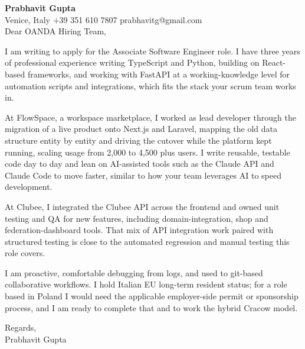 \documentclass[a4paper,10.5pt]{article}
\begin{document}
\textbf{Prabhavit Gupta}\\
Venice, Italy \textbar{} +39 351 610 7807 \textbar{} prabhavitg@gmail.com\\[10pt]
Dear OANDA Hiring Team,

I am writing to apply for the Associate Software Engineer role. I have three years of professional experience writing TypeScript and Python, building on React-based frameworks, and working with FastAPI at a working-knowledge level for automation scripts and integrations, which fits the stack your scrum team works in.

At FlowSpace, a workspace marketplace, I worked as lead developer through the migration of a live product onto Next.js and Laravel, mapping the old data structure entity by entity and driving the cutover while the platform kept running, scaling usage from 2,000 to 4,500 plus users. I write reusable, testable code day to day and lean on AI-assisted tools such as the Claude API and Claude Code to move faster, similar to how your team leverages AI to speed development.

At Clubee, I integrated the Clubee API across the frontend and owned unit testing and QA for new features, including domain-integration, shop and federation-dashboard tools. That mix of API integration work paired with structured testing is close to the automated regression and manual testing this role covers.

I am proactive, comfortable debugging from logs, and used to git-based collaborative workflows. I hold Italian EU long-term resident status; for a role based in Poland I would need the applicable employer-side permit or sponsorship process, and I am ready to complete that and to work the hybrid Cracow model.

Regards,\\
Prabhavit Gupta
\end{document}
